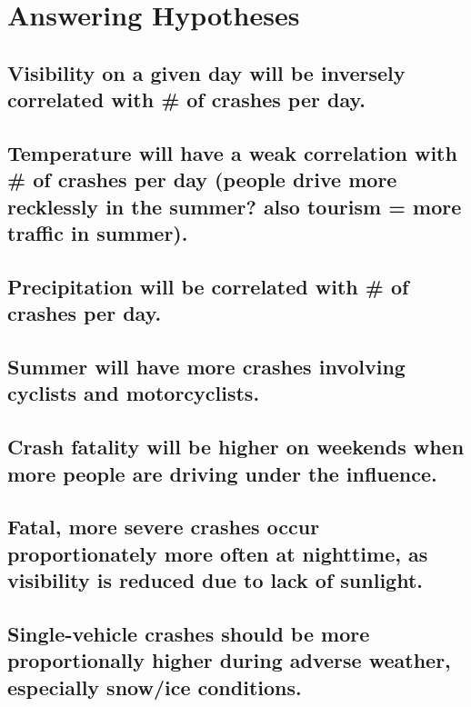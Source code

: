 \documentclass[11pt, a4paper]{article}
\begin{document}
\pagebreak
\section{Answering Hypotheses}

\subsection{Visibility on a given day will be inversely correlated with \# of crashes per day.}






\pagebreak
\subsection{Temperature will have a weak correlation with \# of crashes per day (people drive more recklessly in the summer? also tourism = more traffic in summer).}







\pagebreak
\subsection{Precipitation will be correlated with \# of crashes per day.} 







\pagebreak
\subsection{Summer will have more crashes involving cyclists and motorcyclists.} 








\pagebreak
\subsection{Crash fatality will be higher on weekends when more people are driving under the influence.} 









\pagebreak
\subsection{Fatal, more severe crashes occur proportionately more often at nighttime, as visibility is reduced due to lack of sunlight.} 








\pagebreak
\subsection{Single-vehicle crashes should be more proportionally higher during adverse weather, especially snow/ice conditions.}
\end{document}
